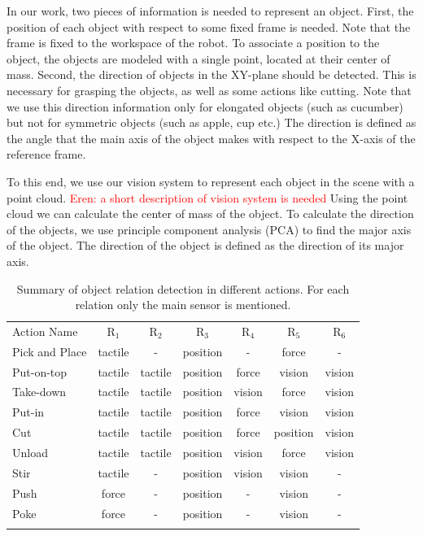 In our work, two pieces of information is needed to represent an object.
First, the position of each object with respect to some fixed frame is needed.
Note that the frame is fixed to the workspace of the robot.
To associate a position to the object, the objects are modeled with a single point, located at their center of mass.
Second, the direction of objects in the XY-plane should be detected.
This is necessary for grasping the objects, as well as some actions like cutting.
Note that we use this direction information only for elongated objects (such as cucumber) but not for symmetric objects (such as apple, cup etc.)
The direction is defined as the angle that the main axis of the object makes with respect to the X-axis of the reference frame.

To this end, we use our vision system to represent each object in the scene with a point cloud.
\textcolor{red}{Eren: a short description of vision system is needed}
Using the point cloud we can calculate the center of mass of the object.
To calculate the direction of the objects, we use principle component analysis (PCA) to find the major axis of the object.
The direction of the object is defined as the direction of its major axis.

\begin{table}
\centering
\caption{Summary of object relation detection in different actions. For each relation only the main sensor is mentioned.}
\begin{tabular}{ lcccccc }
\hline\noalign{\smallskip}
 Action Name &  $\text{R}_1$ & $\text{R}_2$ &$\text{R}_3$ &$\text{R}_4$ &$\text{R}_5$&$\text{R}_6$ \\
\noalign{\smallskip}\hline\noalign{\smallskip}
 Pick and Place & tactile & -       & position & -     &  force & - \\
 Put-on-top     & tactile & tactile & position & force &  vision & vision \\
 Take-down      & tactile & tactile & position & vision&  force & vision \\
 Put-in         & tactile & tactile & position & force &  vision & vision \\
 Cut            & tactile & tactile & position & force &  position & vision \\
 Unload         & tactile & tactile & position & vision&  force & vision \\
 Stir           & tactile & -       & position & vision&  vision & - \\
 Push           & force   & -       & position & -     &  vision & - \\
 Poke           & force   & -       & position & -     &  vision & - \\
\noalign{\smallskip}\hline
\end{tabular}
\label{tab:relation_detection}
\end{table}



